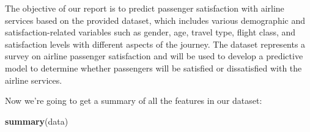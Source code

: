 \documentclass[
]{article}
\newenvironment{Shaded}{\begin{snugshade}}{\end{snugshade}}
\newcommand{\FunctionTok}[1]{\textcolor[rgb]{0.13,0.29,0.53}{\textbf{#1}}}
\newcommand{\NormalTok}[1]{#1}
\begin{document}
The objective of our report is to predict passenger satisfaction with
airline services based on the provided dataset, which includes various
demographic and satisfaction-related variables such as gender, age,
travel type, flight class, and satisfaction levels with different
aspects of the journey. The dataset represents a survey on airline
passenger satisfaction and will be used to develop a predictive model to
determine whether passengers will be satisfied or dissatisfied with the
airline services.

Now we're going to get a summary of all the features in our dataset:

\begin{Shaded}
\begin{Highlighting}[]
\FunctionTok{summary}\NormalTok{(data)}
\end{Highlighting}
\end{Shaded}
\end{document}
